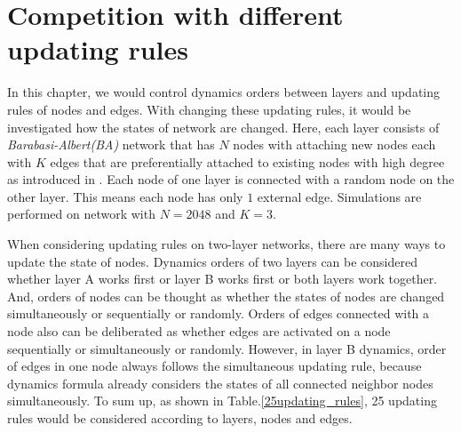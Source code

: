 
\chapter{Competition with different updating rules}
\label{chap4}
In this chapter, we would control dynamics orders between layers and updating rules of nodes and edges. With changing these updating rules, it would be investigated how the states of network are changed. Here, each layer consists of \textit{Barabasi-Albert(BA)} network that has $N$ nodes with attaching new nodes each with $K$ edges that are preferentially attached to existing nodes with high degree as introduced in \parencite{barabasi1999}. Each node of one layer is connected with a random node on the other layer. This means each node has only $1$ external edge. Simulations are performed on network with $N=2048$ and $K=3$.

When considering updating rules on two-layer networks, there are many ways to update the state of nodes. Dynamics orders of two layers can be considered whether layer A works first or layer B works first or both layers work together. And, orders of nodes can be thought as whether the states of nodes are changed simultaneously or sequentially or randomly. Orders of edges connected with a node also can be deliberated as whether edges are activated on a node sequentially or simultaneously or randomly. However, in layer B dynamics, order of edges in one node always follows the simultaneous updating rule, because dynamics formula already considers the states of all connected neighbor nodes simultaneously. To sum up, as shown in Table.\ref{25updating_rules}, 25 updating rules would be considered according to layers, nodes and edges.

